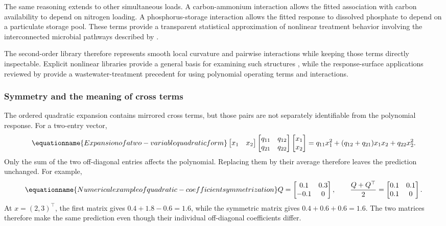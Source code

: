 The same reasoning extends to other simultaneous loads. A carbon-ammonium interaction allows the fitted association with carbon availability to depend on nitrogen loading. A phosphorus-storage interaction allows the fitted response to dissolved phosphate to depend on a particulate storage pool. These terms provide a transparent statistical approximation of nonlinear treatment behavior involving the interconnected microbial pathways described by \citet{Henze1999}.

The second-order library therefore represents smooth local curvature and pairwise interactions while keeping those terms directly inspectable. Explicit nonlinear libraries provide a general basis for examining such structures \citep{Brunton2016}, while the response-surface applications reviewed by \citet{Nazlabadi2021} provide a wastewater-treatment precedent for using polynomial operating terms and interactions.

\subsubsection{Symmetry and the meaning of cross terms}

The ordered quadratic expansion contains mirrored cross terms, but those pairs are not separately identifiable from the polynomial response. For a two-entry vector,
\begin{equation}
\equationname{Expansion of a two-variable quadratic form}
\label{eq:icsor_scalar_quadratic}
\begin{bmatrix}x_1&x_2\end{bmatrix}
\begin{bmatrix}q_{11}&q_{12}\\q_{21}&q_{22}\end{bmatrix}
\begin{bmatrix}x_1\\x_2\end{bmatrix}
=q_{11}x_1^2+(q_{12}+q_{21})x_1x_2+q_{22}x_2^2.
\end{equation}
Only the sum of the two off-diagonal entries affects the polynomial. Replacing them by their average therefore leaves the prediction unchanged. For example,
\begin{equation}
\equationname{Numerical example of quadratic-coefficient symmetrization}
\label{eq:icsor_symmetry_numbers}
Q=\begin{bmatrix}0.1&0.3\\-0.1&0\end{bmatrix},
\qquad
\frac{Q+Q^\top}{2}=\begin{bmatrix}0.1&0.1\\0.1&0\end{bmatrix}.
\end{equation}
At \(x=(2,3)^\top\), the first matrix gives \(0.4+1.8-0.6=1.6\), while the symmetric matrix gives \(0.4+0.6+0.6=1.6\). The two matrices therefore make the same prediction even though their individual off-diagonal coefficients differ.

